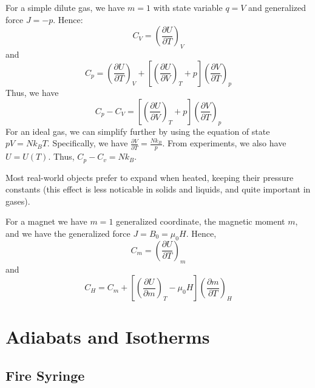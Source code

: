 \documentclass[12pt, a4paper, oneside, openright, titlepage]{book}
\begin{document}
\begin{eg}[Gas]
    For a simple dilute gas, we have $m = 1$ with state variable $q = V$ and generalized force $J = -p$. Hence: \begin{equation*}
        C_V = \left(\frac{\partial U}{\partial T}\right)_V
    \end{equation*}
    and \begin{equation*}
        C_p = \left(\frac{\partial U}{\partial T}\right)_V + \left[\left(\frac{\partial U}{\partial V}\right)_{T} + p\right]\left(\frac{\partial V}{\partial T}\right)_p
    \end{equation*}
    Thus, we have \begin{equation*}
        C_p - C_V = \left[\left(\frac{\partial U}{\partial V}\right)_{T} + p\right]\left(\frac{\partial V}{\partial T}\right)_p
    \end{equation*}
    For an ideal gas, we can simplify further by using the equation of state $pV = Nk_BT$. Specifically, we have $\frac{\partial V}{\partial T} = \frac{Nk_B}{p}$. From experiments, we also have $U = U(T)$. Thus, $C_p - C_v = Nk_B$.
\end{eg}

\begin{rmk}
    Most real-world objects prefer to expand when heated, keeping their pressure constants (this effect is less noticable in solids and liquids, and quite important in gases).
\end{rmk}


\begin{eg}[Magnet]
    For a magnet we have $m = 1$ generalized coordinate, the magnetic moment $m$, and we have the generalized force $J = B_0 = \mu_0H$. Hence, \begin{equation*}
        C_m = \left(\frac{\partial U}{\partial T}\right)_m
    \end{equation*}
    and \begin{equation*}
        C_H = C_m + \left[\left(\frac{\partial U}{\partial m}\right)_T - \mu_0H\right]\left(\frac{\partial m}{\partial T}\right)_H
    \end{equation*}
\end{eg}



\section{Adiabats and Isotherms}

\subsection{Fire Syringe}
\end{document}
